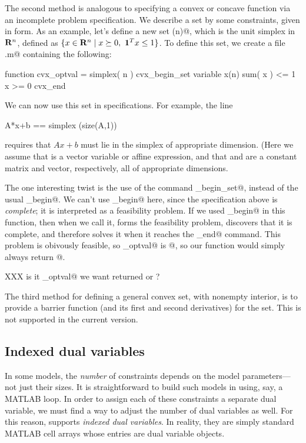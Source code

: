 \documentclass[12pt]{article}
\newcommand{\ones}{\mathbf 1}
\begin{document}
The second method is analogous to specifying a convex or concave
function via an incomplete \cvx problem specification.
We describe a set by some constraints, given in \cvx form.
As an example, let's define a new set \verb@simplex(n)@, which is the
unit simplex in $\R^n$, defined as $\{x \in \R^n \;|\; 
x \succeq 0,~\ones^T x\leq 1 \}$.
To define this set, we create a file \verb@simplex.m@ containing
the following:
\begin{code}
function cvx_optval = simplex( n )
cvx_begin_set
variable x(n)
sum( x ) <= 1
x >= 0
cvx_end
\end{code}
We can now use this set in \cvx specifications.  For example, 
the line
\begin{code}
	A*x+b == simplex (size(A,1)) 
\end{code}
requires that $Ax+b$ must lie in the simplex of appropriate
dimension.
(Here we assume that \verb@x@ is a vector variable or affine
expression, and that \verb@A@ and \verb@b@ are a constant
matrix and vector, respectively, all of appropriate dimensions.

The one interesting twist is the use of the command 
\verb@cvx_begin_set@, instead of the usual \verb@cvx_begin@.
We can't use \verb@cvx_begin@ here, since the \cvx specification
above is \emph{complete}; it is interpreted as a feasibility problem.
If we used \verb@cvx_begin@ in this function, then when we call it,
\cvx forms the feasibility problem, discovers that it is complete,
and therefore solves it when it reaches the \verb@cvx_end@ command.
This problem is obivously feasible, so \verb@cvx_optval@ is @,
so our function would simply always return @.

XXX is it \verb@cvx_optval@ we want returned or \verb@x@?

The third method for defining a general convex set, with nonempty
interior, is to provide a barrier function (and its first and 
second derivatives) for the set.
This is not supported in the current version.
\fi

\subsection{Indexed dual variables}
\label{sec:indexeddual}

In some models, the \emph{number} of constraints depends on the model
parameters---not just their sizes. It is
straightforward to build such models in \cvx using, say, a
MATLAB \verb@for@ loop. In order to assign each of these constraints
a separate dual variable, we must find a way to adjust the number of
dual variables as well. For this reason, \cvx supports
\emph{indexed dual variables}. In reality, they are simply standard
MATLAB cell arrays whose entries are \cvx dual variable objects.
\end{document}
